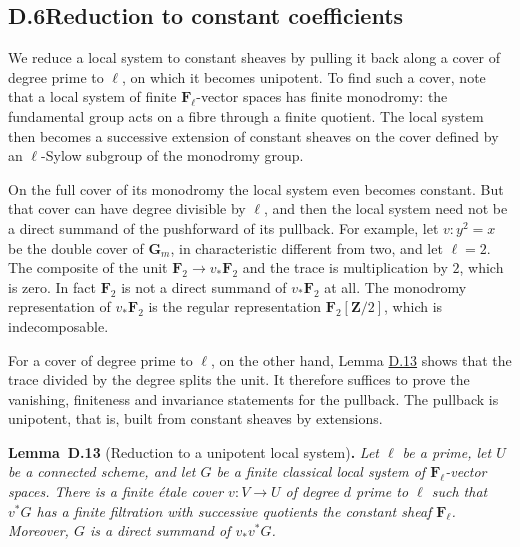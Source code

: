\documentclass[11pt]{article}
\newenvironment{bpstatement}[2]{\par\addvspace{0.6\baselineskip}\noindent\textbf{#1}#2\textbf{.}\enspace\ignorespaces}
  {\par\addvspace{0.4\baselineskip}}
\newenvironment{bpstatementit}[2]{\begin{bpstatement}{#1}{#2}\itshape\ignorespaces}{\end{bpstatement}}
\begin{document}
\subsection*{\texorpdfstring{D.6\quad Reduction to constant coefficients}{D.6 Reduction to constant coefficients}}
\label{bp215}%
\label{bp216}%
We reduce a local system to constant sheaves by pulling it back along a cover of degree prime to \(\ell\), on which it becomes unipotent. To find such a cover, note that a local system of finite \(\mathbf F_\ell\)-vector spaces has finite monodromy: the fundamental group acts on a fibre through a finite quotient. The local system then becomes a successive extension of constant sheaves on the cover defined by an \(\ell\)-Sylow subgroup of the monodromy group.

On the full cover of its monodromy the local system even becomes constant. But that cover can have degree divisible by \(\ell\), and then the local system need not be a direct summand of the pushforward of its pullback. For example, let \(v:y^2=x\) be the double cover of \(\mathbf G_m\), in characteristic different from two, and let \(\ell=2\). The composite of the unit \(\mathbf F_2\to v_*\mathbf F_2\) and the trace is multiplication by \(2\), which is zero. In fact \(\mathbf F_2\) is not a direct summand of \(v_*\mathbf F_2\) at all. The monodromy representation of \(v_*\mathbf F_2\) is the regular representation \(\mathbf F_2[\mathbf Z/2]\), which is indecomposable.

For a cover of degree prime to \(\ell\), on the other hand, Lemma \hyperref[bp217]{D.13} shows that the trace divided by the degree splits the unit. It therefore suffices to prove the vanishing, finiteness and invariance statements for the pullback. The pullback is unipotent, that is, built from constant sheaves by extensions.

\label{bp217}%
\begin{bpstatementit}{Lemma~D.13}{ (Reduction to a unipotent local system)}
Let \(\ell\) be a prime, let \(U\) be a connected scheme, and let \(G\) be a finite classical local system of \(\mathbf F_\ell\)-vector spaces.  There is a finite étale cover \(v:V\to U\) of degree \(d\) prime to \(\ell\) such that \(v^*G\) has a finite filtration with successive quotients the constant sheaf \(\mathbf F_\ell\).  Moreover, \(G\) is a direct summand of \(v_*v^*G\).
\end{bpstatementit}
\end{document}
